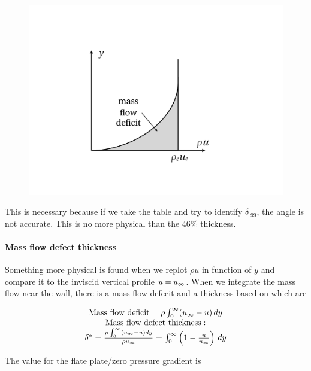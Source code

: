 			\begin{figure}
			\vspace{0mm}
			\includegraphics[scale=0.23]{ch5/8}
			\label{fig:5.8}
			\end{figure}
			This is necessary because if we take the table and try to identify $\delta _{.99}$, the angle is not accurate. This is no more physical than the 46\% thickness. 
			
			\paragraph{Mass flow defect thickness} Something more physical is found when we replot $\rho u$ in function of $y$ and compare it to the inviscid vertical profile $u = \uinf$. When we integrate the mass flow near the wall, there is a mass flow defecit and a thickness based on which are
			
			\begin{equation}
			\begin{array}{c}
				\mbox{Mass flow deficit} = \rho \int _0 ^\infty (\uinf - u)\, dy \\
				\mbox{Mass flow defect thickness}:\\
				 \delta ^* = \frac{\rho \int _0 ^\infty (\uinf - u) dy }{\rho \uinf} = \int _0 ^\infty \left( 1-\frac{u}{\uinf} \right)\, dy
			\end{array}
			\end{equation}
			
			The value for the flate plate/zero pressure gradient is 
			
